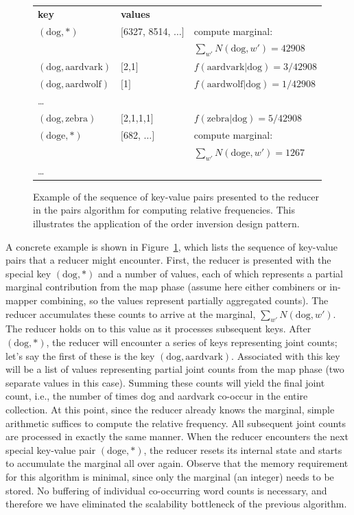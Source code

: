 \documentclass[11pt]{article}
\begin{document}
\begin{figure}[t]
\begin{tabular}{lll}
\textbf{key} & \textbf{values} &  \\
$(\textrm{dog}, \ast)$        & $[$6327, 8514, $\ldots$$]$ & compute marginal: \\
 & & $\sum_{w'}{N(\textrm{dog},w')} = 42908$\\
$(\textrm{dog}, \textrm{aardvark})$ & $[$2,1$]$    & $f(\textrm{aardvark}|\textrm{dog}) = 3/42908$ \\
$(\textrm{dog}, \textrm{aardwolf})$ & $[$1$]$      & $f(\textrm{aardwolf}|\textrm{dog}) = 1/42908$ \\
\ldots            &      & \\
$(\textrm{dog}, \textrm{zebra})$    & $[$2,1,1,1$]$    & $f(\textrm{zebra}|\textrm{dog}) = 5/42908$ \\
$(\textrm{doge}, \ast)$       & $[$682, $\ldots$$]$  & compute marginal: \\
&& $\sum_{w'}{N(\textrm{doge},w')} = 1267$\\
\ldots            &      & \\
\end{tabular}
\caption{Example of the sequence of key-value pairs presented to the
  reducer in the pairs algorithm for computing relative frequencies.
  This illustrates the application of the order inversion design
  pattern.}
\label{figure:chapter3:cond-prob-reducer}
\end{figure}

A concrete example is shown in
Figure~\ref{figure:chapter3:cond-prob-reducer}, which lists the
sequence of key-value pairs that a reducer might encounter.  First,
the reducer is presented with the special key $(\textrm{dog}, \ast)$
and a number of values, each of which represents a partial marginal
contribution from the map phase (assume here either combiners or
in-mapper combining, so the values represent partially aggregated
counts).  The reducer accumulates these counts to arrive at the
marginal, $\sum_{w'}{N(\textrm{dog},w')}$.  The reducer holds on to
this value as it processes subsequent keys.  After $(\textrm{dog},
\ast)$, the reducer will encounter a series of keys representing joint
counts; let's say the first of these is the key $(\textrm{dog},
\textrm{aardvark})$.  Associated with this key will be a list of
values representing partial joint counts from the map phase (two
separate values in this case).  Summing these counts will yield the
final joint count, i.e., the number of times dog and aardvark co-occur
in the entire collection.  At this point, since the reducer already
knows the marginal, simple arithmetic suffices to compute the relative
frequency.  All subsequent joint counts are processed in exactly the
same manner.  When the reducer encounters the next special key-value
pair $(\textrm{doge}, \ast)$, the reducer resets its internal state
and starts to accumulate the marginal all over again.  Observe that
the memory requirement for this algorithm is minimal, since only the
marginal (an integer) needs to be stored.  No buffering of individual
co-occurring word counts is necessary, and therefore we have
eliminated the scalability bottleneck of the previous algorithm.
\end{document}
